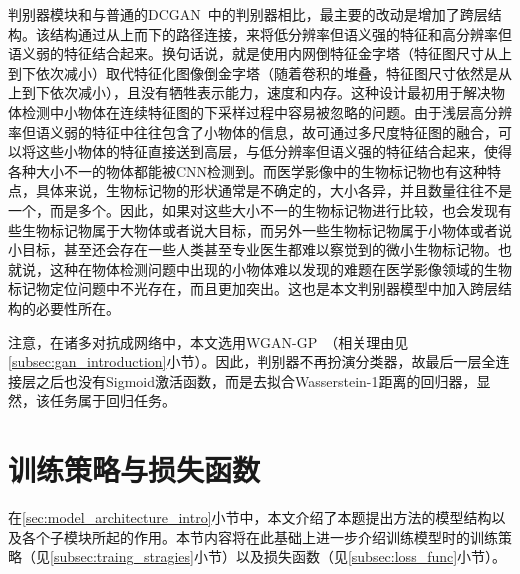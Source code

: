 判别器模块和与普通的DCGAN~\cite{radford2015unsupervised}中的判别器相比，最主要的改动是增加了跨层结构。该结构通过从上而下的路径连接，来将低分辨率但语义强的特征和高分辨率但语义弱的特征结合起来。换句话说，就是使用内网倒特征金字塔（特征图尺寸从上到下依次减小）取代特征化图像倒金字塔（随着卷积的堆叠，特征图尺寸依然是从上到下依次减小），且没有牺牲表示能力，速度和内存。这种设计最初用于解决物体检测中小物体在连续特征图的下采样过程中容易被忽略的问题。由于浅层高分辨率但语义弱的特征中往往包含了小物体的信息，故可通过多尺度特征图的融合，可以将这些小物体的特征直接送到高层，与低分辨率但语义强的特征结合起来，使得各种大小不一的物体都能被CNN检测到。而医学影像中的生物标记物也有这种特点，具体来说，生物标记物的形状通常是不确定的，大小各异，并且数量往往不是一个，而是多个。因此，如果对这些大小不一的生物标记物进行比较，也会发现有些生物标记物属于大物体或者说大目标，而另外一些生物标记物属于小物体或者说小目标，甚至还会存在一些人类甚至专业医生都难以察觉到的微小生物标记物。也就说，这种在物体检测问题中出现的小物体难以发现的难题在医学影像领域的生物标记物定位问题中不光存在，而且更加突出。这也是本文判别器模型中加入跨层结构的必要性所在。

注意，在诸多对抗成网络中，本文选用WGAN-GP~\cite{gulrajani2017improved}（相关理由见\ref{subsec:gan_introduction}小节）。因此，判别器不再扮演分类器，故最后一层全连接层之后也没有Sigmoid激活函数，而是去拟合Wasserstein-1距离的回归器，显然，该任务属于回归任务。

\section{训练策略与损失函数}\label{sec:loss_func_training_stragies}
在\ref{sec:model_architecture_intro}小节中，本文介绍了本题提出方法的模型结构以及各个子模块所起的作用。本节内容将在此基础上进一步介绍训练模型时的训练策略（见\ref{subsec:traing_stragies}小节）以及损失函数（见\ref{subsec:loss_func}小节）。
